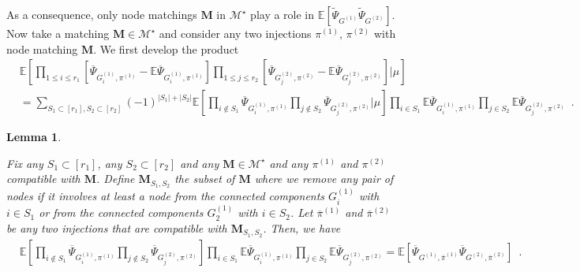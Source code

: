 \documentclass{article}
\newtheorem{lemma}{Lemma}
\begin{document}
    As a consequence, only node matchings $\mathbf{M}$ in $\mathcal{M}^{\star}$ play a role in $\mathbb{E}[\widetilde{\Psi}_{G^{(1)}} \widetilde{\Psi}_{G^{(2)}}]$. 
    Now take a matching $\mathbf M \in \mathcal{M}^{\star}$ and consider any two injections $\pi^{(1)}$, $ \pi^{(2)}$ with node matching $\mathbf M$. We first develop the product
    \begin{align*}
    &\mathbb{E}\left[\prod_{1\leq i\leq r_1}\left[\overline{\Psi}_{G^{(1)}_i, \pi^{(1)}} - \mathbb E \overline{\Psi}_{G^{(1)}_i, \pi^{(1)}}\right]\prod_{1\leq j\leq r_2} \left[\overline{\Psi}_{G^{(2)}_j, \pi^{(2)}} - \mathbb E\overline{\Psi}_{G^{(2)}_j, \pi^{(2)}}\right]\Big|\mu\right]\\
    &= \sum_{S_1 \subset [r_1], S_2\subset [r_2]} (-1)^{|S_1|+|S_2|} \mathbb{E}\left[\prod_{i\not\in S_1}  \overline{\Psi}_{G^{(1)}_i, \pi^{(1)}} \prod_{j\not\in S_2} \overline{\Psi}_{G^{(2)}_j, \pi^{(2)}} \Big|\mu\right] \prod_{i \in S_1} \mathbb E \overline{\Psi}_{G^{(1)}_i, \pi^{(1)}} \prod_{j \in S_2} \mathbb E \overline{\Psi}_{G^{(2)}_j, \pi^{(2)}}\enspace . 
    \end{align*}
    
    
    
    \begin{lemma}\label{lem:cores}
      
      Fix any $S_1\subset [r_1]$, any $S_2\subset [r_2]$ and any $\mathbf{M}\in \mathcal{M}^{\star}$ and any $\pi^{(1)}$ and $\pi^{(2)}$ compatible with $\mathbf{M}$.  Define $\mathbf{M}_{S_1,S_2}$ the subset of $\mathbf{M}$ where we remove any pair of nodes if it involves at least a node from the connected components $G^{(1)}_i$ with $i\in S_1$ or from the connected components $G^{(1)}_2$ with $i\in S_2$.  Let $\overline{\pi}^{(1)}$ and $\overline{\pi}^{(2)}$ be any two injections that are compatible with $\mathbf{M}_{S_1,S_2}$. Then, we have 
        \begin{align*}
        &\mathbb{E}\left[\prod_{i\not\in S_1}  \overline{\Psi}_{G^{(1)}_i, \pi^{(1)}} \prod_{j\not\in S_2} \overline{\Psi}_{G^{(2)}_j, \pi^{(2)}} \right] \prod_{i \in S_1} \mathbb E \overline{\Psi}_{G^{(1)}_i, \pi^{(1)}} \prod_{j \in S_2} \mathbb E \overline{\Psi}_{G^{(2)}_j, \pi^{(2)}} =  \mathbb{E}\left[ \overline{\Psi}_{G^{(1)}, \overline{\pi}^{(1)}}  \overline{\Psi}_{G^{(2)}, \overline{\pi}^{(2)}} \right]\enspace . 
        \end{align*}
    \end{lemma}
    
\end{document}

